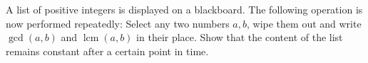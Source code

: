 A list of positive integers is displayed on a blackboard.
The following operation is now performed repeatedly: Select any two numbers $a,b$,
wipe them out and write $\gcd(a,b)$ and $\operatorname{lcm}(a,b)$ in their place.
Show that the content of the list remains constant after a certain point in time.
